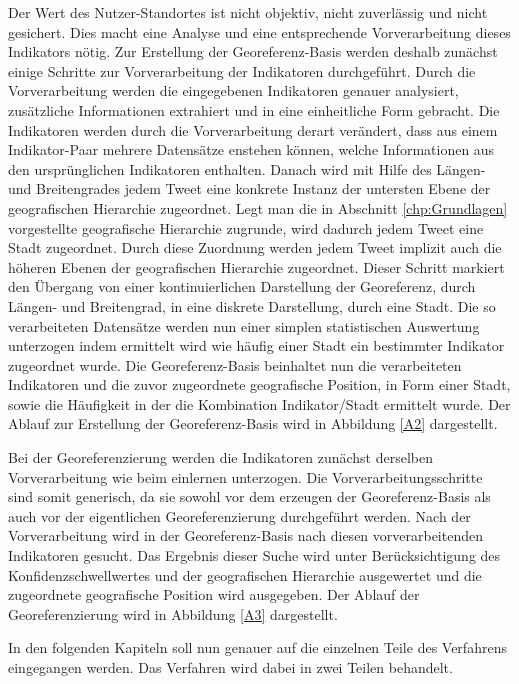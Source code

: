 	Der Wert des Nutzer-Standortes ist nicht objektiv, nicht zuverlässig und nicht gesichert.
	Dies macht eine Analyse und eine entsprechende Vorverarbeitung dieses Indikators nötig.
	Zur Erstellung der Georeferenz-Basis werden deshalb zunächst einige Schritte zur Vorverarbeitung der Indikatoren durchgeführt.
	Durch die Vorverarbeitung werden die eingegebenen Indikatoren genauer analysiert, zusätzliche Informationen extrahiert und in eine einheitliche Form gebracht.
	Die Indikatoren werden durch die Vorverarbeitung derart verändert, dass aus einem Indikator-Paar mehrere Datensätze enstehen können, welche Informationen aus den ursprünglichen Indikatoren enthalten.
	Danach wird mit Hilfe des Längen- und Breitengrades jedem Tweet eine konkrete Instanz der untersten Ebene der geografischen Hierarchie zugeordnet.
	Legt man die in Abschnitt \ref{chp:Grundlagen} vorgestellte geografische Hierarchie zugrunde, wird dadurch jedem Tweet eine Stadt zugeordnet.
	Durch diese Zuordnung werden jedem Tweet implizit auch die höheren Ebenen der geografischen Hierarchie zugeordnet.   	 
	Dieser Schritt markiert den Übergang von einer kontinuierlichen Darstellung der Georeferenz, durch Längen- und Breitengrad, in eine diskrete Darstellung, durch eine Stadt. 
	Die so verarbeiteten Datensätze werden nun einer simplen statistischen Auswertung unterzogen indem ermittelt wird wie häufig einer Stadt ein bestimmter Indikator zugeordnet wurde.
	Die Georeferenz-Basis beinhaltet nun die verarbeiteten Indikatoren und die zuvor zugeordnete geografische Position, in Form einer Stadt, sowie die Häufigkeit in der die Kombination Indikator/Stadt ermittelt wurde.
	Der Ablauf zur Erstellung der Georeferenz-Basis wird in Abbildung \ref{A2} dargestellt.

	Bei der Georeferenzierung werden die Indikatoren zunächst derselben Vorverarbeitung wie beim einlernen unterzogen.
	Die Vorverarbeitungsschritte sind somit generisch, da sie sowohl vor dem erzeugen der Georeferenz-Basis als auch vor der eigentlichen Georeferenzierung durchgeführt werden.
	Nach der Vorverarbeitung wird in der Georeferenz-Basis nach diesen vorverarbeitenden Indikatoren gesucht.
	Das Ergebnis dieser Suche wird unter Berücksichtigung des Konfidenzschwellwertes und der geografischen Hierarchie ausgewertet und die zugeordnete geografische Position wird ausgegeben.  
	Der Ablauf der Georeferenzierung wird in Abbildung \ref{A3} dargestellt. 


	In den folgenden Kapiteln soll nun genauer auf die einzelnen Teile des Verfahrens eingegangen werden. 
	Das Verfahren wird dabei in zwei Teilen behandelt.

